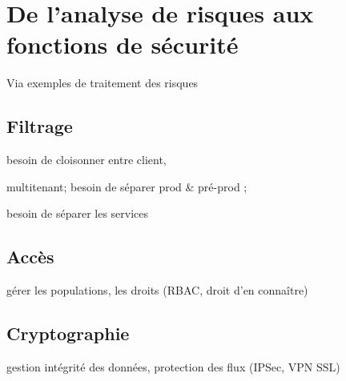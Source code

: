 


\section{De l’analyse de risques aux fonctions de sécurité}
Via exemples de traitement des risques 

\subsection{Filtrage}

besoin de cloisonner entre client, 

multitenant; besoin de séparer prod \& pré-prod ; 

besoin de séparer les services


\subsection{Accès}
gérer les populations, les droits (RBAC, droit d’en connaître)
\subsection{Cryptographie}

gestion intégrité des données, protection des flux (IPSec, VPN SSL)





